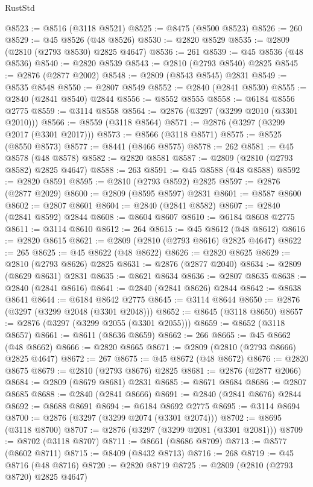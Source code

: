 \begin{lexlean}{RustStd}
\begin{coremodule}
@8523 := @8516 (@3118 @8521)
@8525 := @8475 (@8500 @8523)
@8526 := 260
@8529 := @45 @8526 (@48 @8526)
@8530 := @2820 @8529
@8535 := @2809 (@2810 (@2793 @8530) @2825 @4647)
@8536 := 261
@8539 := @45 @8536 (@48 @8536)
@8540 := @2820 @8539
@8543 := @2810 (@2793 @8540) @2825
@8545 := @2876 (@2877 @2002)
@8548 := @2809 (@8543 @8545) @2831
@8549 := @8535 @8548
@8550 := @2807 @8549
@8552 := @2840 (@2841 @8530)
@8555 := @2840 (@2841 @8540) @2844
@8556 := @8552 @8555
@8558 := @6184 @8556 @2775
@8559 := @3114 @8558
@8564 := @2876 (@3297 (@3299 @2010 (@3301 @2010)))
@8566 := @8559 (@3118 @8564)
@8571 := @2876 (@3297 (@3299 @2017 (@3301 @2017)))
@8573 := @8566 (@3118 @8571)
@8575 := @8525 (@8550 @8573)
@8577 := @8441 (@8466 @8575)
@8578 := 262
@8581 := @45 @8578 (@48 @8578)
@8582 := @2820 @8581
@8587 := @2809 (@2810 (@2793 @8582) @2825 @4647)
@8588 := 263
@8591 := @45 @8588 (@48 @8588)
@8592 := @2820 @8591
@8595 := @2810 (@2793 @8592) @2825
@8597 := @2876 (@2877 @2029)
@8600 := @2809 (@8595 @8597) @2831
@8601 := @8587 @8600
@8602 := @2807 @8601
@8604 := @2840 (@2841 @8582)
@8607 := @2840 (@2841 @8592) @2844
@8608 := @8604 @8607
@8610 := @6184 @8608 @2775
@8611 := @3114 @8610
@8612 := 264
@8615 := @45 @8612 (@48 @8612)
@8616 := @2820 @8615
@8621 := @2809 (@2810 (@2793 @8616) @2825 @4647)
@8622 := 265
@8625 := @45 @8622 (@48 @8622)
@8626 := @2820 @8625
@8629 := @2810 (@2793 @8626) @2825
@8631 := @2876 (@2877 @2040)
@8634 := @2809 (@8629 @8631) @2831
@8635 := @8621 @8634
@8636 := @2807 @8635
@8638 := @2840 (@2841 @8616)
@8641 := @2840 (@2841 @8626) @2844
@8642 := @8638 @8641
@8644 := @6184 @8642 @2775
@8645 := @3114 @8644
@8650 := @2876 (@3297 (@3299 @2048 (@3301 @2048)))
@8652 := @8645 (@3118 @8650)
@8657 := @2876 (@3297 (@3299 @2055 (@3301 @2055)))
@8659 := @8652 (@3118 @8657)
@8661 := @8611 (@8636 @8659)
@8662 := 266
@8665 := @45 @8662 (@48 @8662)
@8666 := @2820 @8665
@8671 := @2809 (@2810 (@2793 @8666) @2825 @4647)
@8672 := 267
@8675 := @45 @8672 (@48 @8672)
@8676 := @2820 @8675
@8679 := @2810 (@2793 @8676) @2825
@8681 := @2876 (@2877 @2066)
@8684 := @2809 (@8679 @8681) @2831
@8685 := @8671 @8684
@8686 := @2807 @8685
@8688 := @2840 (@2841 @8666)
@8691 := @2840 (@2841 @8676) @2844
@8692 := @8688 @8691
@8694 := @6184 @8692 @2775
@8695 := @3114 @8694
@8700 := @2876 (@3297 (@3299 @2074 (@3301 @2074)))
@8702 := @8695 (@3118 @8700)
@8707 := @2876 (@3297 (@3299 @2081 (@3301 @2081)))
@8709 := @8702 (@3118 @8707)
@8711 := @8661 (@8686 @8709)
@8713 := @8577 (@8602 @8711)
@8715 := @8409 (@8432 @8713)
@8716 := 268
@8719 := @45 @8716 (@48 @8716)
@8720 := @2820 @8719
@8725 := @2809 (@2810 (@2793 @8720) @2825 @4647)

\end{coremodule}
\end{lexlean}
